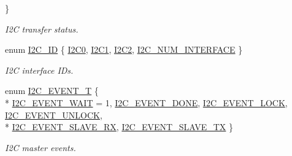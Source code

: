 \begin{DoxyCompactItemize}
 \}
\begin{DoxyCompactList}\small\item\em I2\-C transfer status. \end{DoxyCompactList}\item 
enum \hyperlink{group__I2C__17XX__40XX_gaec46000c6a1fe2c12c9a0c7ee3677626}{I2\-C\-\_\-\-I\-D} \{ \hyperlink{group__I2C__17XX__40XX_ggaec46000c6a1fe2c12c9a0c7ee3677626a8b606b29817406621b85b78b1ee9e653}{I2\-C0}, 
\hyperlink{group__I2C__17XX__40XX_ggaec46000c6a1fe2c12c9a0c7ee3677626aeb0f494c71f34592c5a4500ee98ab4a2}{I2\-C1}, 
\hyperlink{group__I2C__17XX__40XX_ggaec46000c6a1fe2c12c9a0c7ee3677626ae2cc6f0481e798aedb5fd5c6a2bfc01b}{I2\-C2}, 
\hyperlink{group__I2C__17XX__40XX_ggaec46000c6a1fe2c12c9a0c7ee3677626a84f3a2e3885474dda12c3d223eef5304}{I2\-C\-\_\-\-N\-U\-M\-\_\-\-I\-N\-T\-E\-R\-F\-A\-C\-E}
 \}
\begin{DoxyCompactList}\small\item\em I2\-C interface I\-Ds. \end{DoxyCompactList}\item 
enum \hyperlink{group__I2C__17XX__40XX_gacb2cd4e03ea48339d327e4f387441bf3}{I2\-C\-\_\-\-E\-V\-E\-N\-T\-\_\-\-T} \{ \\*
\hyperlink{group__I2C__17XX__40XX_ggacb2cd4e03ea48339d327e4f387441bf3a565d2f9e44285e1965deb390497f62ac}{I2\-C\-\_\-\-E\-V\-E\-N\-T\-\_\-\-W\-A\-I\-T} = 1, 
\hyperlink{group__I2C__17XX__40XX_ggacb2cd4e03ea48339d327e4f387441bf3a43d00f7d92100d4af6df5514e4ccf1d1}{I2\-C\-\_\-\-E\-V\-E\-N\-T\-\_\-\-D\-O\-N\-E}, 
\hyperlink{group__I2C__17XX__40XX_ggacb2cd4e03ea48339d327e4f387441bf3acec197aede70fe12008a68435bf5f339}{I2\-C\-\_\-\-E\-V\-E\-N\-T\-\_\-\-L\-O\-C\-K}, 
\hyperlink{group__I2C__17XX__40XX_ggacb2cd4e03ea48339d327e4f387441bf3aae6af45644ff5abf7016b5a8e8f41393}{I2\-C\-\_\-\-E\-V\-E\-N\-T\-\_\-\-U\-N\-L\-O\-C\-K}, 
\\*
\hyperlink{group__I2C__17XX__40XX_ggacb2cd4e03ea48339d327e4f387441bf3a290fcc1bb657102af26daa1b84472848}{I2\-C\-\_\-\-E\-V\-E\-N\-T\-\_\-\-S\-L\-A\-V\-E\-\_\-\-R\-X}, 
\hyperlink{group__I2C__17XX__40XX_ggacb2cd4e03ea48339d327e4f387441bf3a3911d9b6505f77f0bed3f21b2710ca58}{I2\-C\-\_\-\-E\-V\-E\-N\-T\-\_\-\-S\-L\-A\-V\-E\-\_\-\-T\-X}
 \}
\begin{DoxyCompactList}\small\item\em I2\-C master events. \end{DoxyCompactList}\end{DoxyCompactItemize}
